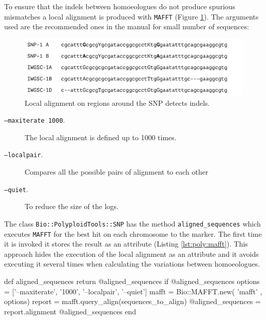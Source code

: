 To ensure that the \acrshort{indels} between homoeologues do not produce spurious mismatches a local alignment is produced with \verb|MAFFT| (Figure \ref{fig:poly:localSequence}). 
The arguments used are the recommended ones in the manual for small number of sequences:

\begin{figure}
\centering
\includegraphics[width=1\textwidth]{PolyMarker/Figures/aln/localAlignment.pdf}
\caption{Local alignment on regions around the SNP detects \acrshort{indels}.}
\label{fig:poly:localSequence}
\end{figure}

\begin{description}
\item[\texttt{--maxiterate 1000}.] The local alignment is defined up to 1000 times.
\item[\texttt{--localpair}.] Compares all the possible pairs of alignment to each other
\item[\texttt{--quiet}.] To reduce the size of the logs.  
\end{description}

The class \verb|Bio::PolyploidTools::SNP| has the method \verb|aligned_sequences| which executes \verb|MAFFT| for the best hit on each chromosome to the marker. 
The first time it is invoked it stores the result as an attribute (Listing \ref{lst:poly:mafft}).
This approach hides the execution of the local alignment as an attribute and it avoids executing it several times when calculating the variations between homoeologues. 

\begin{code}[language=Ruby,caption={[\texttt{Bio::PolyploidTools::SNP.aligned\_sequences}]Method in \texttt{Bio::PolyploidTools::SNP} that calculates the local alignment}, label=lst:poly:mafft]
def aligned_sequences
  return @aligned_sequences if @aligned_sequences
  options = ['--maxiterate', '1000', '--localpair', '--quiet']
  mafft = Bio::MAFFT.new( 'mafft' , options)
  report = mafft.query_align(sequences_to_align)
  @aligned_sequences = report.alignment
  @aligned_sequences
end
\end{code}


